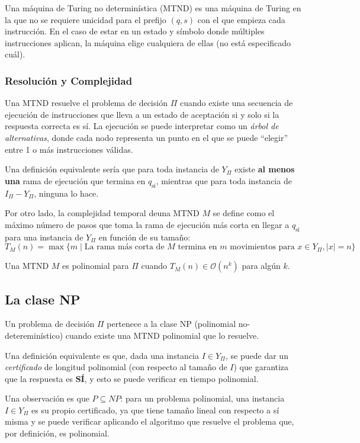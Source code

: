 \documentclass[a4paper]{report}
\newcommand{\BigO}[1]{\ensuremath{\mathcal{O}(#1)}}
\begin{document}
Una máquina de Turing no determinística (MTND) es una máquina de Turing en la que no se requiere unicidad para el prefijo $(q, s)$ con el que empieza cada instrucción. En el caso de estar en un estado y símbolo donde múltiples instrucciones aplican, la máquina elige cualquiera de ellas (no está especificado cuál).

\subsubsection{Resolución y Complejidad}

Una MTND resuelve el problema de decisión $\Pi$ cuando existe una secuencia de ejecución de instrucciones que lleva a un estado de aceptación si y solo si la respuesta correcta es sí. La ejecución se puede interpretar como un \textit{árbol de alternativas}, donde cada nodo representa un punto en el que se puede ``elegir'' entre 1 o más instrucciones válidas.

Una definición equivalente sería que para toda instancia de $Y_{\Pi}$ existe \textbf{al menos una} rama de ejecución que termina en $q_{\text{sí}}$, mientras que para toda instancia de $I_{\Pi} - Y_{\Pi}$, ninguna lo hace.

Por otro lado, la complejidad temporal deuna MTND $M$ se define como el máximo número de pasos que toma la rama de ejecución más corta en llegar a $q_{\text{sí}}$ para una instancia de $Y_{\Pi}$ en función de su tamaño:
    $$T_M(n) = \max\{m \mid \text{La rama más corta de $M$ termina en $m$ movimientos para $x \in Y_{\Pi}, |x| = n$}\}$$

Una MTND $M$ es polinomial para $\Pi$ cuando $T_M(n) \in \BigO{n^k}$ para algún $k$.

\subsection{La clase NP}

Un problema de decisión $\Pi$ pertenece a la clase NP (polinomial no-detereminístico) cuando existe una MTND polinomial que lo resuelve.

Una definición equivalente es que, dada una instancia $I \in Y_{\Pi}$, se puede dar un \textit{certificado} de longitud polinomial (con respecto al tamaño de $I$) que garantiza que la respuesta es \textbf{SÍ}, y esto se puede verificar en tiempo polinomial.

Una observación es que $P \subseteq NP$: para un problema polinomial, una instancia $I \in Y_{\Pi}$ es su propio certificado, ya que tiene tamaño lineal con respecto a sí misma y se puede verificar aplicando el algoritmo que resuelve el problema que, por definición, es polinomial.
\end{document}
